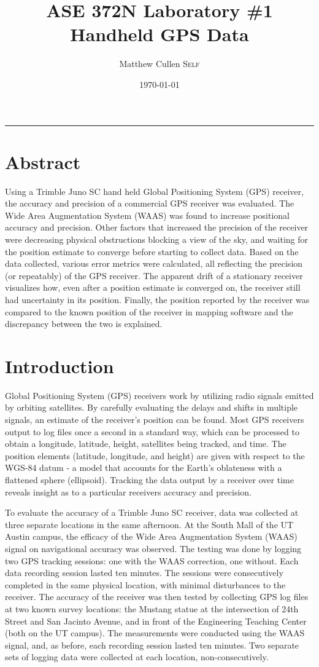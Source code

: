 \documentclass[11pt]{article}
\title{ASE 372N Laboratory \#1 \\ \huge \bfseries Handheld GPS Data}
\author{\Large Matthew Cullen \textsc{Self}}
\date{\today}
\begin{document}
\maketitle
\hrule
\section{Abstract}

Using a Trimble Juno SC hand held Global Positioning System (GPS) receiver, the accuracy and precision of a commercial GPS receiver was evaluated. The Wide Area Augmentation System (WAAS) was found to increase positional accuracy and precision. Other factors that increased the precision of the receiver were decreasing physical obstructions blocking a view of the sky, and waiting for the position estimate to converge before starting to collect data. Based on the data collected, various error metrics were calculated, all reflecting the precision (or repeatably) of the GPS receiver. The apparent drift of a stationary receiver visualizes how, even after a position estimate is converged on, the receiver still had uncertainty in its position. Finally, the position reported by the receiver was compared to the known position of the receiver in mapping software and the discrepancy between the two is explained.


\section{Introduction}
Global Positioning System (GPS) receivers work by utilizing radio signals emitted by orbiting satellites. By carefully evaluating the delays and shifts in multiple signals, an estimate of the receiver's position can be found. Most GPS receivers output to log files once a second in a standard way, which can be processed to obtain a longitude, latitude, height, satellites being tracked, and time. The position elements (latitude, longitude, and height) are given with respect to the WGS-84 datum - a model that accounts for the Earth's oblateness with a flattened sphere (ellipsoid). Tracking the data output by a receiver over time reveals insight as to a particular receivers accuracy and precision.

To evaluate the accuracy of a Trimble Juno SC receiver, data was collected at three separate locations in the same afternoon. At the South Mall of the UT Austin campus, the efficacy of the Wide Area Augmentation System (WAAS) signal on navigational accuracy was observed. The testing was done by logging two GPS tracking sessions: one with the WAAS correction, one without. Each data recording session lasted ten minutes. The sessions were consecutively completed in the same physical location, with minimal disturbances to the receiver. The accuracy of the receiver was then tested by collecting GPS log files at two known survey locations: the Mustang statue at the intersection of 24th Street and San Jacinto Avenue, and in front of the Engineering Teaching Center (both on the UT campus). The measurements were conducted using the WAAS signal, and, as before, each recording session lasted ten minutes. Two separate sets of logging data were collected at each location, non-consecutively.
\end{document}

